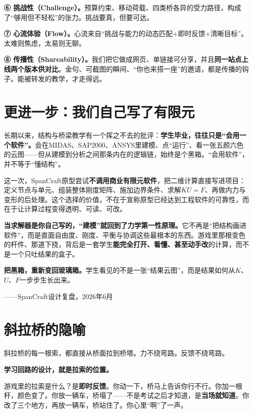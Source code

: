 \textbf{⑥ 挑战性（Challenge）。}预算约束、移动荷载、四类桥各异的受力路径，构成了``够用但不轻松''的张力。挑战要真，但要可达。

\textbf{⑦ 心流体验（Flow）。}心流来自``挑战与能力的动态匹配+即时反馈+清晰目标''。太难则焦虑，太易则无聊。

\textbf{⑧ 传播性（Shareability）。}我们把它做成网页、单链接可分享，并且\textbf{同一站点上线两个版本供对比}。金句、可截图的瞬间、``你也来搭一座''的邀请，都是传播的钩子。能被转发的教学，才走得远。

\section{更进一步：我们自己写了有限元}

长期以来，结构与桥梁教学有一个挥之不去的批评：\textbf{学生毕业，往往只是``会用一个软件''。}会在MIDAS、SAP2000、ANSYS里建模、点``运行''、看一张五颜六色的云图——但从建模到分析之间那条内在的逻辑链，始终是个黑箱。``会用软件''，并不等于``懂结构''。

这一次，SpanCraft原型尝试\textbf{不调用商业有限元软件}，把二维计算直接写进项目：定义节点与单元、组装整体刚度矩阵、施加边界条件、求解$KU=F$、再做内力与变形的后处理。这个选择的价值，不在于宣称原型已经达到工程软件的可靠性，而在于让计算过程变得透明、可读、可改。

\begin{shiyu-inline}
\textbf{当求解器是你自己写的，``建模''就回到了力学第一性原理。}它不再是``把结构画进软件''，而是直面自由度、刚度、平衡与协调这些最根本的东西。游戏里那根变色的杆件、那道下挠，背后是一套学生\textbf{能完全打开、看懂、甚至动手改}的计算，而不是一个只吐结果的盒子。

\textbf{把黑箱，重新变回玻璃箱。}学生看见的不是一张``结果云图''，而是结果如何从$K$、$U$、$F$一步步生长出来。

\hfill ——SpanCraft设计复盘，2026年6月
\end{shiyu-inline}

\section{斜拉桥的隐喻}

斜拉桥的每一根索，都直接从桥面拉到桥塔。力不绕弯路。反馈不绕弯路。

\textbf{学习回路的设计，就是拉索的位置。}

游戏里的拉索是什么？是\textbf{即时反馈}。你动一下，桥马上告诉你行不行。你加一根杆，颜色变了。你放一辆车，桥塌了——不是考试之后才知道，是\textbf{当场就知道}。你改了三个地方，再放一辆车，桥站住了。你心里``啊''了一声。

